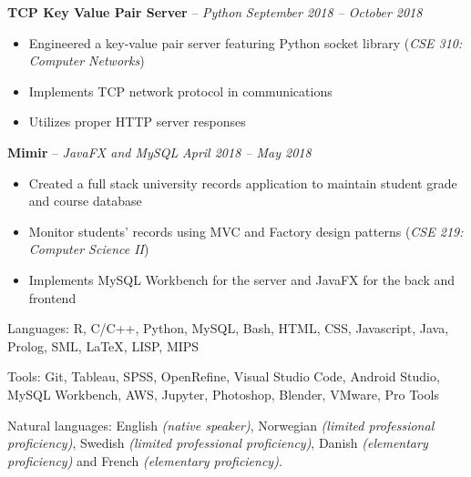 \documentclass[11pt,letterpaper]{article}
\begin{document}
										
\headedsection 
{\textbf{TCP Key Value Pair Server} -- \textit{Python}}
{\textit{September 2018 -- October 2018}} {
	\begin{itemize}[noitemsep,nolistsep]
		\item Engineered a key-value pair server featuring Python socket library (\textit{CSE 310: Computer Networks})
		\item Implements TCP network protocol in communications	
		\item Utilizes proper HTTP server responses
	\end{itemize}
}	
					
										
\headedsection 
{\textbf{Mimir} -- \textit{JavaFX and MySQL}}
{\textit{April 2018 -- May 2018}} {
	\begin{itemize}[noitemsep,nolistsep]
		\item Created a full stack university records application to maintain student grade and course database
		\item Monitor students' records using MVC and Factory design patterns (\textit{CSE 219: Computer Science II})
		\item Implements MySQL Workbench for the server and JavaFX for the back and frontend
	\end{itemize}
}
										
										
										
\spacedhrule{0.2em}{-0.8em} 
										
										
										
										
										
\inlineheadsection 
{Languages:}
{R, C/C++, Python, MySQL, Bash, HTML, CSS, Javascript, Java, Prolog, SML, {\LaTeX}, LISP, MIPS}
										
										
\inlineheadsection 
{Tools:}
{Git, Tableau, SPSS, OpenRefine, Visual Studio Code, Android Studio, MySQL Workbench, AWS, Jupyter, Photoshop, Blender, VMware, Pro Tools}
										
										
\inlineheadsection 
{Natural languages:}
{English \textit{(native speaker)}, Norwegian \textit{(limited professional proficiency)}, Swedish \textit{(limited professional proficiency)}, Danish \textit{(elementary proficiency)} and French \textit{(elementary proficiency)}.}
										
										
\end{document}
